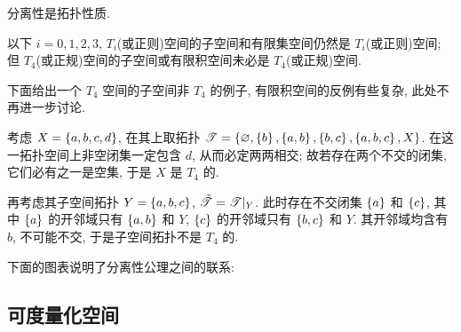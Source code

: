     \begin{Proposition}
        分离性是拓扑性质.
    \end{Proposition}

    \begin{Proposition}
        以下 $ i=0,1,2,3 $, $ T_i $(或正则)空间的子空间和有限集空间仍然是 $ T_i $(或正则)空间; 但 $ T_4 $(或正规)空间的子空间或有限积空间未必是 $ T_4 $(或正规)空间.
    \end{Proposition}

    下面给出一个 $ T_4 $ 空间的子空间非 $ T_4 $ 的例子, 有限积空间的反例有些复杂, 此处不再进一步讨论.

    \begin{Example}
        考虑 $ X=\left\{ a,b,c,d \right\} $, 在其上取拓扑 $ \mathscr{T}=\left\{ \varnothing,\left\{ b \right\},\left\{ a,b \right\},\left\{ b,c \right\},\left\{ a,b,c \right\},X \right\} $. 在这一拓扑空间上非空闭集一定包含 $ d $, 从而必定两两相交; 故若存在两个不交的闭集, 它们必有之一是空集, 于是 $ X $ 是 $ T_4 $ 的.
        
        再考虑其子空间拓扑 $ Y=\left\{ a,b,c \right\} $, $ \tilde{\mathscr{T}}=\mathscr{T}|_Y $. 此时存在不交闭集 $ \left\{ a \right\} $ 和 $ \left\{ c \right\} $, 其中 $ \left\{ a \right\} $ 的开邻域只有 $ \left\{ a,b \right\} $ 和 $ Y $, $ \left\{ c \right\} $ 的开邻域只有 $ \left\{ b,c \right\} $ 和 $ Y $. 其开邻域均含有 $ b $, 不可能不交, 于是子空间拓扑不是 $ T_4 $ 的.
    \end{Example}

    下面的图表说明了分离性公理之间的联系:

    \begin{center}
    \end{center}

\subsection{可度量化空间}


